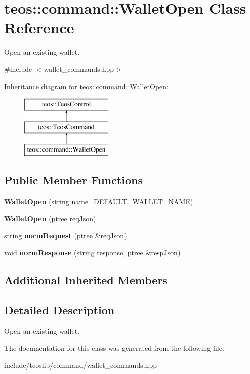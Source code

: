 \hypertarget{classteos_1_1command_1_1_wallet_open}{}\section{teos\+:\+:command\+:\+:Wallet\+Open Class Reference}
\label{classteos_1_1command_1_1_wallet_open}


Open an existing wallet.  




{\ttfamily \#include $<$wallet\+\_\+commands.\+hpp$>$}

Inheritance diagram for teos\+:\+:command\+:\+:Wallet\+Open\+:\begin{figure}[H]
\begin{center}
\leavevmode
\includegraphics[height=3.000000cm]{classteos_1_1command_1_1_wallet_open}
\end{center}
\end{figure}
\subsection*{Public Member Functions}
\begin{DoxyCompactItemize}
\item 
\mbox{\label{classteos_1_1command_1_1_wallet_open_a83737d8d2e5f335266e331e3771c50b4}} 
{\bfseries Wallet\+Open} (string name=D\+E\+F\+A\+U\+L\+T\+\_\+\+W\+A\+L\+L\+E\+T\+\_\+\+N\+A\+ME)
\item 
\mbox{\label{classteos_1_1command_1_1_wallet_open_afe4f67f6e891bf5dcc4e5fb02e372e3f}} 
{\bfseries Wallet\+Open} (ptree req\+Json)
\item 
\mbox{\label{classteos_1_1command_1_1_wallet_open_a7de38b779a421c4964af4679dc5d24f7}} 
string {\bfseries norm\+Request} (ptree \&req\+Json)
\item 
\mbox{\label{classteos_1_1command_1_1_wallet_open_aa8b15aa97a21e79224d627a7417f1bda}} 
void {\bfseries norm\+Response} (string response, ptree \&resp\+Json)
\end{DoxyCompactItemize}
\subsection*{Additional Inherited Members}


\subsection{Detailed Description}
Open an existing wallet. 

The documentation for this class was generated from the following file\+:\begin{DoxyCompactItemize}
\item 
include/teoslib/command/wallet\+\_\+commands.\+hpp\end{DoxyCompactItemize}

